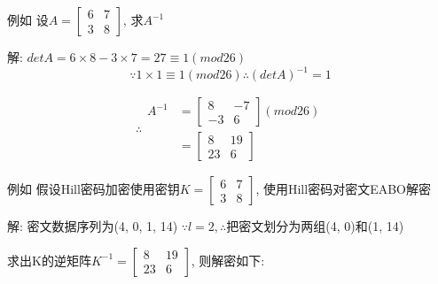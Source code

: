 \documentclass[UTF8]{ctexart}
\begin{document}
\begin{itemize}
\begin{enumerate}
\begin{itemize}
                例如 设$A=\left[ \begin{array}{cc}{6} &{7}\\ {3} &{8} \end{array}\right]$, 求$A^{-1}$

                    解: $detA=6\times 8 - 3\times 7=27\equiv 1(mod 26)$
                    $$
                    \because 1\times 1\equiv 1(mod 26)
                    \therefore (detA)^{-1}=1
                    $$

                    $$
                    \therefore
                    \begin{aligned}
                        A^{-1}&=\left[ \begin{array}{cc}{8} &{-7}\\ {-3} &{6} \end{array}\right](mod 26)\\
                            &=\left[ \begin{array}{cc}{8} &{19}\\ {23} &{6} \end{array}\right]
                    \end{aligned}
                    $$

                例如 假设Hill密码加密使用密钥$K=\left[ \begin{array}{cc}{6} &{7}\\ {3} &{8} \end{array}\right]$, 使用Hill密码对密文EABO解密

                    解: 密文数据序列为(4, 0, 1, 14)
                    $\because l=2, \therefore$把密文划分为两组(4, 0)和(1, 14)

                    求出K的逆矩阵$K^{-1}=\left[ \begin{array}{cc}{8} &{19}\\ {23} &{6}\end{array}\right]$, 则解密如下:


\end{itemize}
\end{enumerate}
\end{itemize}
\end{document}
